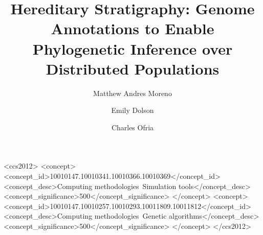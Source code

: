 \title{ Hereditary Stratigraphy: Genome Annotations to Enable Phylogenetic Inference over Distributed Populations }

\author{Matthew Andres Moreno}

\author{Emily Dolson}

\author{Charles Ofria}


\renewcommand{\shortauthors}{Moreno et al.}

\begin{CCSXML}
<ccs2012>
   <concept>
       <concept_id>10010147.10010341.10010366.10010369</concept_id>
       <concept_desc>Computing methodologies~Simulation tools</concept_desc>
       <concept_significance>500</concept_significance>
       </concept>
   <concept>
       <concept_id>10010147.10010257.10010293.10011809.10011812</concept_id>
       <concept_desc>Computing methodologies~Genetic algorithms</concept_desc>
       <concept_significance>500</concept_significance>
       </concept>
 </ccs2012>
\end{CCSXML}





\maketitle
